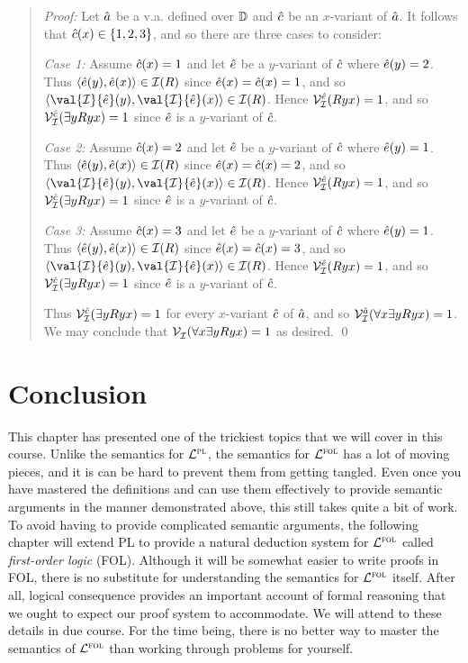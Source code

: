 \begin{quote}
\label{somemodel2}
  \textit{Proof:}
  Let $\hat{a}$ be a v.a. defined over $\mathbb{D}$ and $\hat{c}$ be an $x$-variant of $\hat{a}$.
  It follows that $\hat{c}(x)\in\lbrace1,2,3\rbrace$, and so there are three cases to consider:

  \textit{Case 1:}
  Assume $\hat{c}(x)=1$ and let $\hat{e}$ be a $y$-variant of $\hat{c}$ where $\hat{e}(y)=2$.
  Thus $\langle\hat{e}(y),\hat{e}(x)\rangle\in\mathcal{I}(R)$ since $\hat{e}(x)=\hat{c}(x)=1$, and so $\tuple{\val{\I}{\va{e}}(y),\val{\I}{\va{e}}(x)}\in\I(R)$.
  Hence $\mathcal{V}_{\mathcal{I}}^{\hat{e}}(Ryx)=1$, and so $\mathcal{V}_{\mathcal{I}}^{\hat{c}}(\exists yRyx)=1$ since $\hat{e}$ is a $y$-variant of $\hat{c}$. 

  \textit{Case 2:}
  Assume $\hat{c}(x)=2$ and let $\hat{e}$ be a $y$-variant of $\hat{c}$ where $\hat{e}(y)=1$.
  Thus $\langle\hat{e}(y),\hat{e}(x)\rangle\in\mathcal{I}(R)$ since $\hat{e}(x)=\hat{c}(x)=2$, and so $\tuple{\val{\I}{\va{e}}(y),\val{\I}{\va{e}}(x)}\in\I(R)$.
  Hence $\mathcal{V}_{\mathcal{I}}^{\hat{e}}(Ryx)=1$, and so $\mathcal{V}_{\mathcal{I}}^{\hat{c}}(\exists yRyx)=1$ since $\hat{e}$ is a $y$-variant of $\hat{c}$. 

  \textit{Case 3:}
  Assume $\hat{c}(x)=3$ and let $\hat{e}$ be a $y$-variant of $\hat{c}$ where $\hat{e}(y)=1$.
  Thus $\langle\hat{e}(y),\hat{e}(x)\rangle\in\mathcal{I}(R)$ since $\hat{e}(x)=\hat{c}(x)=3$, and so $\tuple{\val{\I}{\va{e}}(y),\val{\I}{\va{e}}(x)}\in\I(R)$.
  Hence $\mathcal{V}_{\mathcal{I}}^{\hat{e}}(Ryx)=1$, and so $\mathcal{V}_{\mathcal{I}}^{\hat{c}}(\exists yRyx)=1$ since $\hat{e}$ is a $y$-variant of $\hat{c}$. 

  Thus $\mathcal{V}_{\mathcal{I}}^{\hat{c}}(\exists yRyx)=1$ for every $x$-variant $\hat{c}$ of $\hat{a}$, and so $\mathcal{V}_{\mathcal{I}}^{\hat{a}}(\forall x\exists yRyx)=1$.
  We may conclude that $\mathcal{V}_{\mathcal{I}}^{}(\forall x\exists yRyx)=1$ as desired. 
  \qed
\end{quote}



\section{Conclusion}

This chapter has presented one of the trickiest topics that we will cover in this course.
Unlike the semantics for $\mathcal{L}^{\textsc{pl}}$, the semantics for $\mathcal{L}^{\textsc{fol}}$ has a lot of moving pieces, and it is can be hard to prevent them from getting tangled.
Even once you have mastered the definitions and can use them effectively to provide semantic arguments in the manner demonstrated above, this still takes quite a bit of work.
To avoid having to provide complicated semantic arguments, the following chapter will extend PL to provide a natural deduction system for $\mathcal{L}^{\textsc{fol}}$ called \textit{first-order logic} (FOL). 
Although it will be somewhat easier to write proofs in FOL, there is no substitute for understanding the semantics for $\mathcal{L}^{\textsc{fol}}$ itself.
After all, logical consequence provides an important account of formal reasoning that we ought to expect our proof system to accommodate.
We will attend to these details in due course.
For the time being, there is no better way to master the semantics of $\mathcal{L}^{\textsc{fol}}$ than working through problems for yourself.



